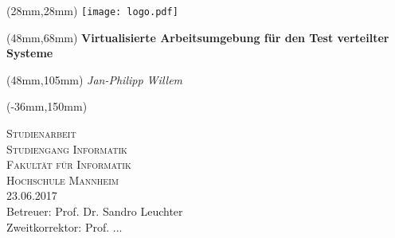 %
% 
%
 
\begin{titlepage}
\begin{textblock*}{130mm}(28mm,28mm) 
{\texttt{[image: logo.pdf]}}
\end{textblock*}%
\begin{textblock*}{130mm}(48mm,68mm) %
	\centering\huge\bfseries
	Virtualisierte Arbeitsumgebung für den Test verteilter Systeme
\end{textblock*}%

\begin{textblock*}{130mm}(48mm,105mm)
	\centering\Large\itshape 
	Jan-Philipp Willem
\end{textblock*}

\begin{textblock*}{297mm}(-36mm,150mm) %
	\begin{center}
		{\scshape\Large Studienarbeit\\ Studiengang Informatik}\\
		\vspace{2cm}
		{\scshape\large Fakultät für Informatik\\Hochschule Mannheim}\\
		\vspace{2cm}
		{\large 23.06.2017} \\ %
		\vspace{3,5cm}
		{\large Betreuer: Prof. Dr. Sandro Leuchter\\
		Zweitkorrektor: Prof. ...}
	\end{center}
\end{textblock*}
\end{titlepage}
\null
\newpage
